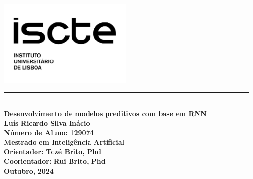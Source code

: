 \begin{titlepage}
	\begin{flushleft}
		\includegraphics[width=0.5\textwidth]{iscte.png}\\[1cm]
	\end{flushleft}
	\noindent
	\textcolor{barraazul}{\rule{\textwidth}{1mm}} %
	\\[0.5cm]
	{\Huge \textbf{\centering Desenvolvimento de modelos preditivos com base em RNN}}\\[1.5cm]
	\noindent
	\textbf{Luís Ricardo Silva Inácio}\\
	\textbf{Número de Aluno: 129074}\\[2cm]
	\textbf{Mestrado em Inteligência Artificial}\\[1.5cm]
	\textbf{Orientador: Tozé Brito, Phd}\\
	\textbf{Coorientador: Rui Brito, Phd}\\[3cm]
	\textbf{Outubro, 2024}
\end{titlepage}
